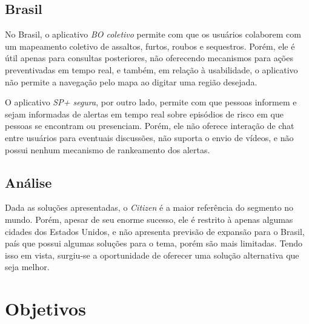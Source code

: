 
\subsection{Brasil}
\label{ss.brasil}


No Brasil, o aplicativo \emph{BO coletivo} permite com que os usuários colaborem com um mapeamento coletivo de assaltos, furtos, roubos e sequestros. Porém, ele é útil apenas para consultas posteriores, não oferecendo mecanismos para ações preventivadas em tempo real, e também, em relação à usabilidade, o aplicativo não permite a navegação pelo mapa ao digitar uma região desejada.


O aplicativo \emph{SP+ segura}, por outro lado, permite com que pessoas informem e sejam informadas de alertas em tempo real sobre episódios de risco em que pessoas se encontram ou presenciam. Porém, ele não oferece interação de chat entre usuários para eventuais discussões, não suporta o envio de vídeos, e não possui nenhum mecanismo de rankeamento dos alertas.

\subsection{Análise}
\label{ss.analise}

Dada as soluções apresentadas, o \emph{Citizen} é a maior referência do segmento no mundo. Porém, apesar de seu enorme sucesso, ele é restrito à apenas algumas cidades dos Estados Unidos, e não apresenta previsão de expansão para o Brasil, país que possui algumas soluções para o tema, porém são mais limitadas. Tendo isso em vista, surgiu-se a oportunidade de oferecer uma solução alternativa que seja melhor.

\section{Objetivos}
\label{s.objetivos}

